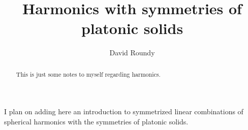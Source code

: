 \documentclass[letterpaper,twocolumn,amsmath,amssymb,pre]{revtex4-1}
\begin{document}
\title{Harmonics with symmetries of platonic solids}

\author{David Roundy}
\begin{abstract}
  This is just some notes to myself regarding harmonics.
\end{abstract}

\newcommand\rot{\ensuremath{\mathbf{\varpi}}}
\newcommand\rhat{\ensuremath{\mathbf{\hat{r}}}}
\newcommand\solidangle{\ensuremath{\Omega}}

\maketitle

I plan on adding here an introduction to symmetrized linear
combinations of spherical harmonics with the symmetries of platonic
solids.
\end{document}

